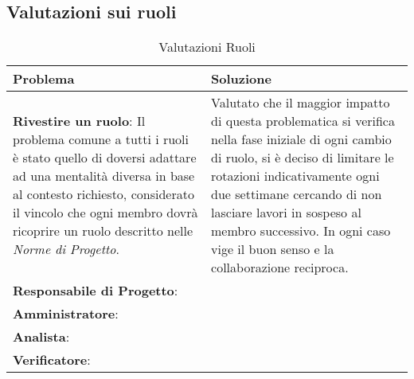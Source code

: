 \subsection{Valutazioni sui ruoli}
	\begin{longtable}{ 
			>{\centering}p{} 
			>{\centering\arraybackslash}p{} }
		
		\caption {Valutazioni Ruoli}		\\
		
		\textbf{\color{white}Problema} &
		\textbf{\color{white}Soluzione}
		\tabularnewline  
		\endhead
		
		\textbf{Rivestire un ruolo}: Il problema comune a tutti i ruoli è stato quello di doversi adattare ad una mentalità diversa in base al contesto richiesto, considerato il vincolo che ogni membro dovrà ricoprire un ruolo descritto nelle \textit{Norme di Progetto}. & Valutato che il maggior impatto di questa problematica si verifica nella fase iniziale di ogni cambio di ruolo, si è deciso di limitare le rotazioni indicativamente ogni due settimane cercando di non lasciare lavori in sospeso al membro successivo. In ogni caso vige il buon senso e la collaborazione reciproca. \\
		
		\textbf{Responsabile di Progetto}: & \\
		
		\textbf{Amministratore}: & \\
		
		\textbf{Analista}: & \\
		
		\textbf{Verificatore}: & \\
		
	\end{longtable}


